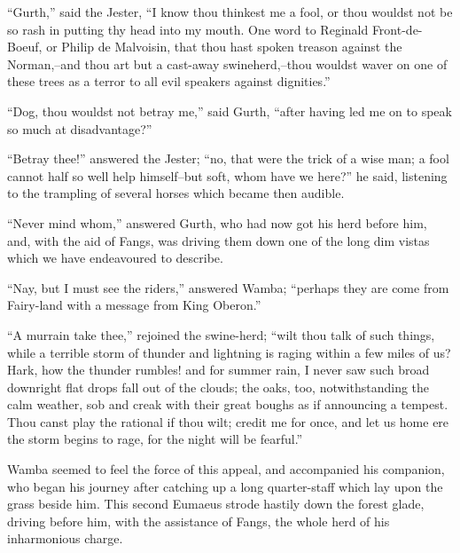 ``Gurth,'' said the Jester, ``I know thou thinkest me a fool, or thou
wouldst not be so rash in putting thy head into my mouth. One word to
Reginald Front-de-Boeuf, or Philip de Malvoisin, that thou hast spoken
treason against the Norman,--and thou art but a cast-away
swineherd,--thou wouldst waver on one of these trees as a terror to all
evil speakers against dignities.''

``Dog, thou wouldst not betray me,'' said Gurth, ``after having led me
on to speak so much at disadvantage?''

``Betray thee!'' answered the Jester; ``no, that were the trick of a
wise man; a fool cannot half so well help himself--but soft, whom have
we here?'' he said, listening to the trampling of several horses which
became then audible.

``Never mind whom,'' answered Gurth, who had now got his herd before
him, and, with the aid of Fangs, was driving them down one of the long
dim vistas which we have endeavoured to describe.

``Nay, but I must see the riders,'' answered Wamba; ``perhaps they are
come from Fairy-land with a message from King Oberon.''

``A murrain take thee,'' rejoined the swine-herd; ``wilt thou talk of
such things, while a terrible storm of thunder and lightning is raging
within a few miles of us? Hark, how the thunder rumbles! and for summer
rain, I never saw such broad downright flat drops fall out of the
clouds; the oaks, too, notwithstanding the calm weather, sob and creak
with their great boughs as if announcing a tempest. Thou canst play the
rational if thou wilt; credit me for once, and let us home ere the storm
begins to rage, for the night will be fearful.''

Wamba seemed to feel the force of this appeal, and accompanied his
companion, who began his journey after catching up a long quarter-staff
which lay upon the grass beside him. This second Eumaeus strode hastily
down the forest glade, driving before him, with the assistance of Fangs,
the whole herd of his inharmonious charge.
